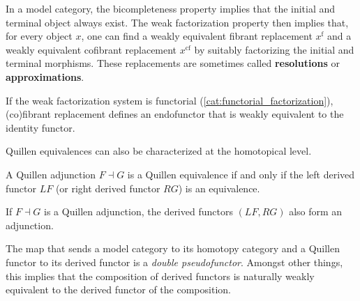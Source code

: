     \begin{property}[Resolution]
        In a model category, the bicompleteness property implies that the initial and terminal object always exist. The weak factorization property then implies that, for every object $x$, one can find a weakly equivalent fibrant replacement $x^\mathrm{f}$ and a weakly equivalent cofibrant replacement $x^\mathrm{cf}$ by suitably factorizing the initial and terminal morphisms. These replacements are sometimes called \textbf{resolutions} or \textbf{approximations}.

        If the weak factorization system is functorial (\cref{cat:functorial_factorization}), (co)fibrant replacement defines an endofunctor that is weakly equivalent to the identity functor.
    \end{property}


    Quillen equivalences can also be characterized at the homotopical level.
    \begin{property}
        A Quillen adjunction $F\dashv G$ is a Quillen equivalence if and only if the left derived functor $LF$ (or right derived functor $RG$) is an equivalence.
    \end{property}
    \begin{property}
        If $F\dashv G$ is a Quillen adjunction, the derived functors $(LF,RG)$ also form an adjunction.
    \end{property}

    \begin{property}
        The map that sends a model category to its homotopy category and a Quillen functor to its derived functor is a \textit{double pseudofunctor}. Amongst other things, this implies that the composition of derived functors is naturally weakly equivalent to the derived functor of the composition.
    \end{property}

